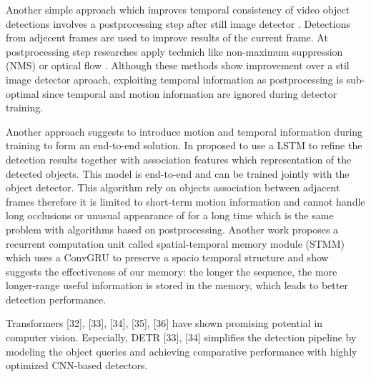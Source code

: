 
Another simple approach which improves temporal consistency of video object detections involves a postprocessing step after still image detector \cite{hanSeqNMSVideoObject2016, kangTCNNTubeletsConvolutional2018, kangObjectDetectionVideo2016}. Detections from adjecent frames are used to improve results of the current frame. At postprocessing step researches apply technich like non-maximum suppression (NMS) \cite{hanSeqNMSVideoObject2016} or optical flow \cite{kangTCNNTubeletsConvolutional2018, kangObjectDetectionVideo2016}. Although these methods show improvement over a stil image detector aproach, exploiting temporal information as postprocessing is sub-optimal since temporal and motion information are ignored during detector training.



Another approach suggests to introduce motion and temporal information during training to form an end-to-end solution. In \cite{Lu_2017_ICCV} proposed to use a LSTM \cite{6795963} to refine the detection results together with association features which representation of the detected objects. This model is end-to-end and can be trained jointly with the object detector. This algorithm rely on objects association between adjacent frames therefore it is limited to short-term motion information and cannot handle long occlusions or unusual appearance of for a long time which is the same problem with algorithms based on postprocessing. Another work proposes a recurrent computation unit called spatial-temporal memory module (STMM) \cite{xiaoVideoObjectDetection2018} which uses a ConvGRU \cite{ballasDelvingDeeperConvolutional2016} to preserve a spacio temporal structure and show suggests the effectiveness of our memory: the longer the sequence, the more longer-range useful information is stored in the memory, which leads to better detection performance.


Transformers [32], [33], [34], [35], [36] have shown promising potential in computer vision. Especially, DETR [33], [34] simplifies the detection pipeline by modeling the object queries and achieving comparative performance with highly optimized CNN-based detectors.



